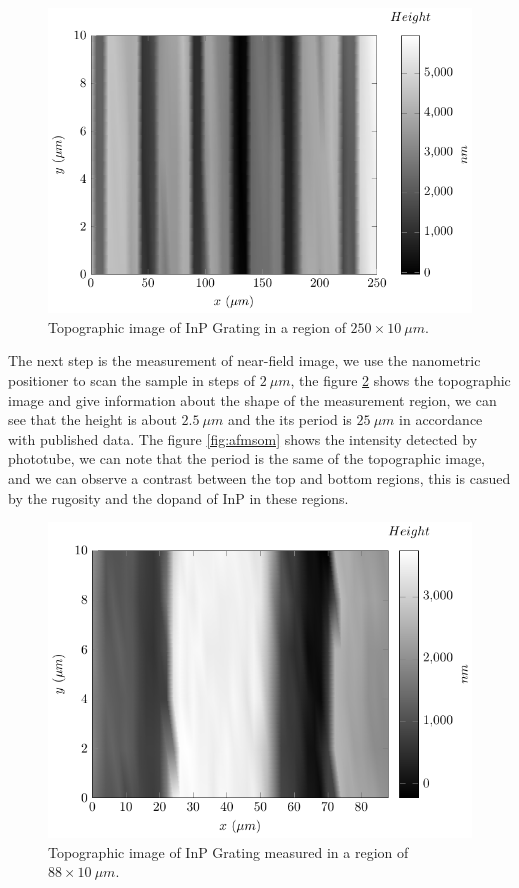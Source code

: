 \documentclass[reprint,aps,prb,citeautoscript,altaffilletter]{revtex4-2}
\begin{document}
	\begin{figure}[!hbt]
		\centering
		\includegraphics[scale=0.6]{figures/result/extafmImag/exAFMImag.pdf}

		\caption{Topographic image of InP Grating in a region of $250 \times 10 ~ \mu m$.}
		\label{fig:afmEx}
	\end{figure}

	The next step is the measurement of near-field image, we use the nanometric positioner to scan the sample in steps of $2~ \mu m$, the figure \ref{fig:afmim2} shows the topographic image and give information about the shape of the
	measurement region, we can see that the height is about $2.5~\mu m$ and the its period is $25~\mu m$ in accordance with published data. The figure \ref{fig:afmsom} shows the intensity detected by phototube, we can note that the period is the same of the topographic image, 
	and we can observe a contrast between the top and bottom  regions, this is casued by the rugosity and the dopand of InP in these regions.

	\begin{figure}[!hbt]
		\centering
		\includegraphics[scale=0.6]{figures/result/afmImag/AFMImag.pdf}

		\caption{Topographic image of InP Grating measured in a region of $88 \times 10 ~ \mu m$.}
		\label{fig:afmim2}
	\end{figure}
\end{document}
